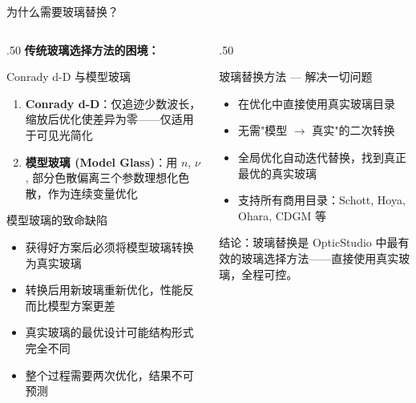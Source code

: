 \begin{frame}{为什么需要玻璃替换？}
    \begin{columns}[T]
        \begin{column}{.50\textwidth}
            \textbf{传统玻璃选择方法的困境：}

            \begin{block}{Conrady d-D 与模型玻璃}
                \begin{enumerate}
                    \item \textbf{Conrady d-D}：仅追迹少数波长，缩放后优化使差异为零——仅适用于可见光简化
                    \item \textbf{模型玻璃 (Model Glass)}：用 $n$, $\nu$, 部分色散偏离三个参数理想化色散，作为连续变量优化
                \end{enumerate}
            \end{block}

            \begin{alertblock}{模型玻璃的致命缺陷}
                \begin{itemize}
                    \item 获得好方案后必须\alert{将模型玻璃转换为真实玻璃}
                    \item 转换后用新玻璃重新优化，性能\alert{反而比模型方案更差}
                    \item 真实玻璃的最优设计可能\alert{结构形式完全不同}
                    \item 整个过程需要\alert{两次优化}，结果不可预测
                \end{itemize}
            \end{alertblock}
        \end{column}
        \hfill
        \begin{column}{.50\textwidth}
            \begin{block}{玻璃替换方法 — 解决一切问题}
                \begin{itemize}
                    \item 在优化中\alert{直接使用真实玻璃目录}
                    \item 无需"模型 $\to$ 真实"的二次转换
                    \item 全局优化自动迭代替换，找到\alert{真正最优}的真实玻璃
                    \item 支持所有商用目录：Schott, Hoya, Ohara, CDGM 等
                \end{itemize}
            \end{block}

            \bigbreak
            \begin{center}
            \end{center}

            \alert{结论：}玻璃替换是 OpticStudio 中\alert{最有效}的玻璃选择方法——直接使用真实玻璃，全程可控。
        \end{column}
    \end{columns}
\end{frame}

